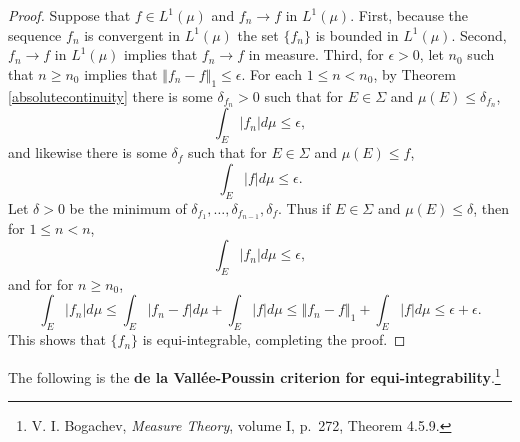 \documentclass{article}
\newcommand{\norm}[1]{\left\Vert #1 \right\Vert}
\theoremstyle{definition}
\theoremstyle{definition}
\begin{document}
\begin{proof}
Suppose that $f \in L^1(\mu)$ and $f_n \to f$ in $L^1(\mu)$. First, because the sequence $f_n$ is convergent in $L^1(\mu)$
the set $\{f_n\}$ is bounded in $L^1(\mu)$. Second, $f_n \to f$ in $L^1(\mu)$ implies
that $f_n \to f$ in measure. Third, 
for $\epsilon>0$,
let $n_0$ such that $n \geq n_0$ implies that $\norm{f_n-f}_1 \leq \epsilon$.
For each $1 \leq n < n_0$,
by Theorem \ref{absolutecontinuity} there is some $\delta_{f_n}>0$ such that
for $E \in \Sigma$ and $\mu(E) \leq \delta_{f_n}$, 
\[
\int_E |f_n| d\mu \leq \epsilon,
\]
and likewise there is some $\delta_f$ such that for $E \in \Sigma$ and $\mu(E) \leq f$,
\[
\int_E |f| d\mu \leq \epsilon.
\]
Let $\delta>0$ be the minimum of $\delta_{f_1},\ldots,\delta_{f_{n-1}},\delta_f$. 
Thus if $E \in \Sigma$ and $\mu(E) \leq \delta$, then for $1 \leq n <n$,
\[
\int_E |f_n| d\mu \leq \epsilon,
\]
and for 
for $n \geq n_0$,
\[
\int_E |f_n| d\mu \leq \int_E |f_n-f| d\mu+\int_E |f| d\mu 
\leq \norm{f_n-f}_1 + \int_E |f| d\mu
\leq \epsilon+\epsilon.
\]
This shows that $\{f_n\}$ is equi-integrable, completing the proof.
\end{proof}



The following is the \textbf{de la Vall\'ee-Poussin criterion for equi-integrability}.\footnote{V. I. Bogachev, {\em Measure Theory}, volume I,
p.~272, Theorem 4.5.9.}
\end{document}
